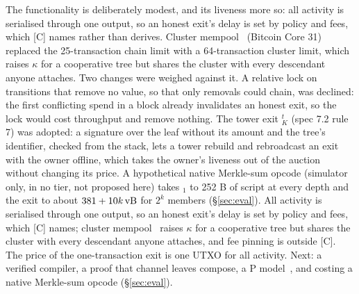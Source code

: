 
\iffullversion
The functionality is deliberately modest, and its liveness more so:
all activity is serialised through one output, so an honest exit's delay
is set by policy and fees, which [C] names rather than derives. Cluster mempool~\cite{clustermempool} (Bitcoin Core 31) replaced the
25-transaction chain limit with a 64-transaction cluster limit, which raises $\kappa$ for a
cooperative tree but shares the cluster with every descendant anyone
attaches. Two changes were weighed against it. A relative lock on
transitions that remove no value, so that only removals could chain, was
declined: the first conflicting spend in a block already invalidates an
honest exit, so the lock would cost throughput and remove nothing. The
tower exit $_K^{t}$ (spec 7.2 rule 7) was adopted: a signature
over the leaf without its amount and the tree's identifier, checked from the stack, lets a
tower rebuild and rebroadcast an exit with the owner offline, which takes
the owner's liveness out of the auction without changing its price. A
hypothetical native Merkle-sum opcode (simulator only, in no tier, not
proposed here) takes $_1$ to 252 B of script at every depth and the
exit to about $381 + 10k\,\mathrm{vB}$ for $2^k$ members (\S\ref{sec:eval}).
\else
All activity is serialised through one output, so an honest exit's delay
is set by policy and fees, which [C] names; cluster
mempool~\cite{clustermempool} raises $\kappa$ for a cooperative tree but
shares the cluster with every descendant anyone attaches, and fee
pinning is outside [C]. The price of the one-transaction exit is one
UTXO for all activity. Next: a
verified compiler, a proof that channel leaves compose, a P
model~\cite{plang}, and costing a native Merkle-sum opcode (\S\ref{sec:eval}).
\fi
